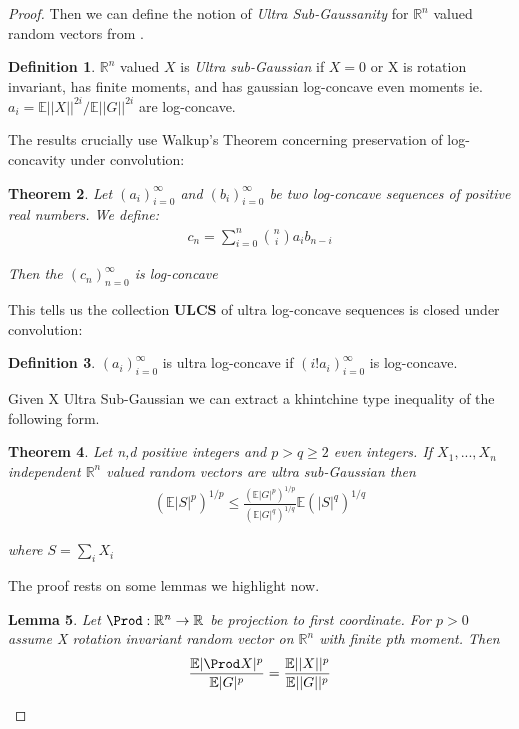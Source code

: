 \documentclass[10pt]{article}
\newcommand{\E}{\mathbb{E}}
\newcommand{\1}{\textbf{1}}
\newcommand{\R}{\mathbb{R}}
\newcommand{\norm}[1]{||#1||}
\newtheorem{theorem}{Theorem}
\newtheorem{lemma}[theorem]{Lemma}
\theoremstyle{remark}
\theoremstyle{definition}
\newtheorem{defn}[theorem]{Definition}
\begin{document}
\begin{proof}
Then we can define the notion of \textit{Ultra Sub-Gaussanity} for $\R^n$ valued random vectors from \cite{NO}.

\begin{defn}
	$\R^n$ valued $X$ is \textit{Ultra sub-Gaussian} if $X=0$ or X is rotation invariant, has finite moments, and has gaussian log-concave even moments ie. $a_i = \E \norm{X}^{2i}/\E \norm{G}^{2i}$ are log-concave.
\end{defn}

The results crucially use Walkup's Theorem concerning preservation of log-concavity under convolution:

\begin{theorem}
	Let $(a_i)_{i=0}^{\infty}$ and $(b_i)_{i=0}^{\infty}$ be two log-concave sequences of positive real numbers. We define:
	\begin{align*}
		c_n = \sum_{i=0}^n {n \choose i} a_i b_{n-i}
	\end{align*}

	Then the $(c_n)_{n=0}^{\infty}$ is log-concave
\end{theorem}

This tells us the collection $\textbf{ULCS}$ of ultra log-concave sequences is closed under convolution:

\begin{defn}
	$(a_i)_{i=0}^{\infty}$ is ultra log-concave if $(i! a_i)_{i=0}^{\infty}$ is log-concave.
\end{defn}

Given X Ultra Sub-Gaussian we can extract a khintchine type inequality of the following form.

\begin{theorem}
	Let n,d positive integers and $p > q \geq 2$ even integers. If $X_1,...,X_n$ independent $\R^n$ valued random vectors are ultra sub-Gaussian then
	\begin{align*}
		(\E |S|^p)^{1/p} \leq \frac{(\E|G|^p)^{1/p}}{(\E|G|^q)^{1/q}}\E (|S|^q)^{1/q}
	\end{align*}

	where $S = \sum_i X_i$
\end{theorem}

The proof rests on some lemmas we highlight now.

\begin{lemma}
	Let $\Prod: \R^n \to \R$ be projection to first coordinate. For $p > 0$ assume X rotation invariant random vector on $\R^n$ with finite pth moment. Then
	\begin{align*}
		\frac{\E|\Prod X|^p}{\E |G|^p} = \frac{\E||X||^p}{\E||G||^p}
	\end{align*}
\end{lemma}


\end{proof}
\end{document}
